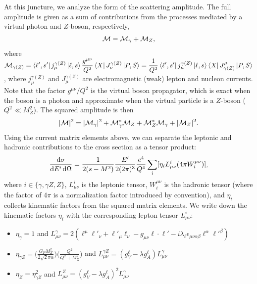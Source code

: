 \documentclass[aps,prd,amsmath,superscriptaddress,floatfix,nofootinbib]{revtex4-2}
\newcommand{\diff}[1]{{\rm d} #1}
\begin{document}
At this juncture, we analyze the form of the scattering amplitude.
The full amplitude is given as a sum of contributions from the processes mediated by a virtual photon and $Z$-boson, respectively,
\begin{eqnarray}
    \label{eq:DIS-amp}
    {\cal M} = {\cal M}_{\gamma} + {\cal M}_{Z}
,\end{eqnarray}
where $\displaystyle {\cal M}_{\gamma(Z)} = \bra{\ell',s'} j_{\mu}^{\gamma(Z)} \ket{\ell,s} \frac{g^{\mu\nu}}{Q^2} \bra{X} J_{\nu}^{\gamma(Z)} \ket{P,S} = \frac{1}{Q^2} \bra{\ell',s'} j_{\mu}^{\gamma(Z)} \ket{\ell,s} \bra{X} J^{\mu}_{\gamma(Z)} \ket{P,S}$, where $j_{\mu}^{\gamma(Z)}$ and $J_{\mu}^{\gamma(Z)}$ are electromagnetic (weak) lepton and nucleon currents.
Note that the factor $g^{\mu\nu}/Q^2$ is the virtual boson propagator, which is exact when the boson is a photon and approximate when the virtual particle is a $Z$-boson ($Q^2 \ll M_{Z}^2$).
The squared amplitude is then
\begin{eqnarray}
    \label{eq:DIS-sq-amp}
    |{\cal M}|^2 = |{\cal M}_{\gamma}|^2 + {\cal M}_{\gamma}^{*}{\cal M}_{Z} + {\cal M}_{Z}^{*}{\cal M}_{\gamma} + |{\cal M}_{Z}|^2
.\end{eqnarray}
Using the current matrix elements above, we can separate the leptonic and hadronic contributions to the cross section as a tensor product:
\begin{eqnarray}
    \label{eq:xsec-lep-had-tensors}
    \frac{\diff \sigma}{\diff E' \, \diff \Omega} = \frac{1}{2(s-M^2)} \frac{E'}{2(2\pi)^3} \frac{e^4}{Q^{4}} \sum_{i} [\eta_{i} L_{\mu\nu}^{i} (4\pi W^{\mu\nu}_{i})]
,\end{eqnarray}
where $i \in \{ \gamma, \gamma Z, Z \}$, $L_{\mu\nu}^{i}$ is the leptonic tensor, $W^{\mu\nu}_{i}$ is the hadronic tensor (where the factor of $4\pi$ is a normalization factor introduced by convention), and $\eta_{i}$ collects kinematic factors from the squared matrix elements.
We write down the kinematic factors $\eta_{i}$ with the corresponding lepton tensor $L_{\mu\nu}^{i}$:
\begin{itemize}
    \item $\eta_{\gamma} = 1$ and $L_{\mu\nu}^{\gamma} = 2(\ell^{\mu} \ell'_{\nu} + \ell'_{\mu} \ell_{\nu} - g_{\mu\nu} \ell \cdot \ell' - i \lambda_{\ell} \epsilon_{\mu\nu\alpha\beta} \ell^{\alpha}\ell'^{\beta})$
    \item $\displaystyle \eta_{\gamma Z} = \Big( \frac{G_{F}M_{Z}^2}{2\sqrt{2} \pi \alpha} \Big) \Big( \frac{Q^2}{Q^2 + M_{Z}^2} \Big)$ and $L_{\mu\nu}^{\gamma Z} = (g_{V}^{\ell} - \lambda g_{A}^{\ell})L_{\mu\nu}^{\gamma}$
    \item $\eta_{Z} = \eta_{\gamma Z}^2$ and $L_{\mu\nu}^{Z} = (g_{V}^{\ell} - \lambda g_{A}^{\ell})^2 L_{\mu\nu}^{\gamma}$
\end{itemize}
\end{document}
